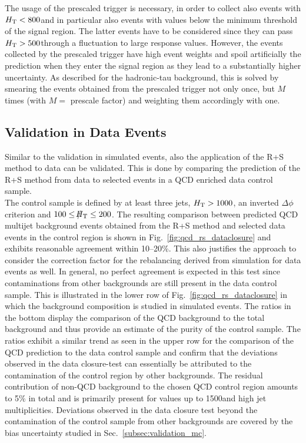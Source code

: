 The usage of the prescaled trigger is necessary, in order to collect also events with $H_{\text{T}} < 800$\gev and in particular also events with \HT values below the minimum \HT threshold of the signal region. The latter events have to be considered since they can pass $H_{\text{T}} > 500$\gev through a fluctuation to large response values. However, the events collected by the prescaled trigger have high event weights and spoil artificially the prediction when they enter the signal region as they lead to a substantially higher uncertainty. As described for the hadronic-tau background, this is solved by smearing the events obtained from the prescaled trigger not only once, but $M$ times (with $M =$ prescale factor) and weighting them accordingly with one.

\subsection{Validation in Data Events}
Similar to the validation in simulated events, also the application of the R+S method to data can be validated. This is done by comparing the prediction of the R+S method from data to selected events in a QCD enriched data control sample. \\
The control sample is defined by at least three jets, $H_{\text{T}} > 1000$\gev, an inverted $\Delta \phi$ criterion and $100 \leq \slash\mkern-12mu{H}_{\text{T}} \leq 200$\gev. The resulting comparison between predicted QCD multijet background events obtained from the R+S method and selected data events in the control region is shown in Fig.~\ref{fig:qcd_rs_dataclosure} and exhibits reasonable agreement within 10--20\%. This also justifies the approach to consider the correction factor for the rebalancing derived from simulation for data events as well. In general, no perfect agreement is expected in this test since contaminations from other backgrounds are still present in the data control sample. This is illustrated in the lower row of Fig.~\ref{fig:qcd_rs_dataclosure} in which the background composition is studied in simulated events. The ratios in the bottom display the comparison of the QCD background to the total background and thus provide an estimate of the purity of the control sample. The ratios exhibit a similar trend as seen in the upper row for the comparison of the QCD prediction to the data control sample and confirm that the deviations observed in the data closure-test can essentially be attributed to the contamination of the control region by other backgrounds. The residual contribution of non-QCD background to the chosen QCD control region amounts to 5\% in total and is primarily present for \HT values up to 1500\gev and high jet multiplicities. Deviations observed in the data closure test beyond the contamination of the control sample from other backgrounds are covered by the bias uncertainty studied in Sec.~\ref{subsec:validation_mc}. \\
